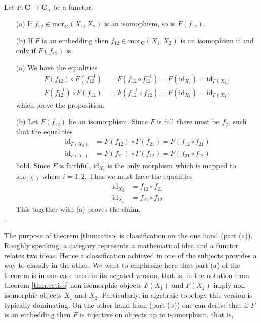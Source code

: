 \\
\begin{thm}
\label{thm:catiso}
Let $F \colon \mathbf{C} \rightarrow \mathbf{C}_{\alpha}$ be a functor.
\begin{enumerate}
\item[(a)]
If $f_{12} \in \mathrm{mor}_{\mathbf{C}}(X_{1},X_{2})$ is an isomophism, so is $F(f_{12})$.
\item[(b)]
If $F$ is an embedding then $f_{12} \in \mathrm{mor}_{\mathbf{C}}(X_{1},X_{2})$ is an isomophism if and only if $F(f_{12})$ is.
\end{enumerate}
\end{thm}
\begin{prf}
\begin{enumerate}
\item[(a)]
We have the equalities
\begin{align*}
  F(f_{12})
  \circ
  F(f_{12}^{-1})
  &=
  F(f_{12} \circ f_{12}^{-1})
  =
  F(\mathrm{id}_{X_{2}})
  =
  \mathrm{id}_{F(X_{2})}
  \\
  F(f_{12}^{-1})
  \circ
  F(f_{12})
  &=
  F(f_{12}^{-1} \circ f_{12})
  =
  F(\mathrm{id}_{X_{1}})
  =
  \mathrm{id}_{F(X_{1})}
\end{align*}
which prove the proposition.
\item[(b)]
Let $F(f_{12})$ be an isomorphism. Since $F$ is full there must be $f_{21}$ such that the equalities
\begin{align*}
  \mathrm{id}_{F(X_{2})}
  &=
  F(f_{12})
  \circ
  F(f_{21})
  =
  F(f_{12} \circ f_{21})
  \\
  \mathrm{id}_{F(X_{1})}
  &=
  F(f_{21})
  \circ
  F(f_{12})
  =
  F(f_{21} \circ f_{12})
\end{align*}
hold. Since $F$ is faithful, $\mathrm{id}_{X_{i}}$ is the only morphism which is mapped to $\mathrm{id}_{F(X_{i})}$ where $i = 1,2$. Thus we must have the equalities
\begin{align*}
  \mathrm{id}_{X_{2}}
  &=
  f_{12}
  \circ
  f_{21}
  \\
  \mathrm{id}_{X_{1}}
  &=
  f_{21}
  \circ
  f_{12}
\end{align*}
This together with (a) proves the claim.
\end{enumerate}
\phantom{proven}
\hfill
$\square$
\end{prf}
The purpose of theorem \ref{thm:catiso} is classification on the one hand (part (a)). Roughly speaking, a category represents a mathematical idea and a functor relates two ideas. Hence a classification achieved in one of the subjects provides a way to classify in the other. We want to emphasize here that part (a) of the theorem is in one case used in its negated version, that is, in the notation from theorem \ref{thm:catiso} non-isomorphic objects $F(X_{1})$ and $F(X_{2})$ imply non-isomorphic objects $X_{1}$ and $X_{2}$. Particularly, in algebraic topology this version is typically dominating. On the other hand from (part (b)) one can derive that if $F$ is an embedding then $F$ is injective on objects up to isomorphism, that is,
